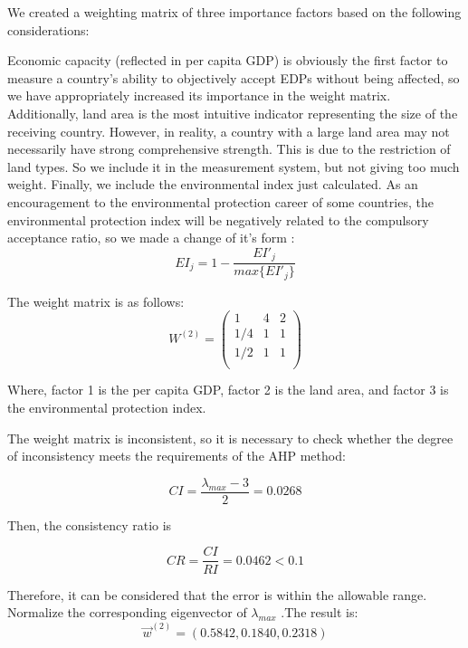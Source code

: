 \documentclass{mcmthesis}
\begin{document}
We created a weighting matrix of three importance factors based on the following considerations:

Economic capacity (reflected in per capita GDP) is obviously the first factor to measure a country's ability to objectively accept EDPs without being affected, so we have appropriately increased its importance in the weight matrix. Additionally, land area is the most intuitive indicator representing the size of the receiving country. However, in reality, a country with a large land area may not necessarily have strong comprehensive strength. This is due to the restriction of land types. So we include it in the measurement system, but not giving too much weight. Finally, we include the environmental index just calculated. As an encouragement to the environmental protection career of some countries, the environmental protection index will be negatively related to the compulsory acceptance ratio, so we made a change of it's form :
\begin{equation}
EI_{j}=1-\dfrac{EI'_{j}}{max\{EI'_{j}\}}
\end{equation}

The weight matrix is as follows:
\[W^{(2)}=
\begin{pmatrix}
{1} & {4} & {2}  \\
{1/4} & {1} & {1}  \\
{1/2} & {1} & {1}  \\
\end{pmatrix}
\]

Where, factor 1 is the per capita GDP, factor 2 is the land area, and factor 3 is the environmental protection index.

The weight matrix is inconsistent, so it is necessary to check whether the degree of inconsistency meets the requirements of the AHP method:

\begin{equation}
	CI=\dfrac{\lambda_{max}-3}{2}=0.0268
\end{equation}

Then, the consistency ratio is

\begin{equation}
CR=\frac{CI}{RI}=0.0462<0.1
\end{equation}

Therefore, it can be considered that the error is within the allowable range. Normalize the corresponding eigenvector of $\lambda_{max}$ .The result is:
\begin{equation}
\overrightarrow{w}^{(2)}=(0.5842, 0.1840, 0.2318)
\end{equation}
\end{document}
